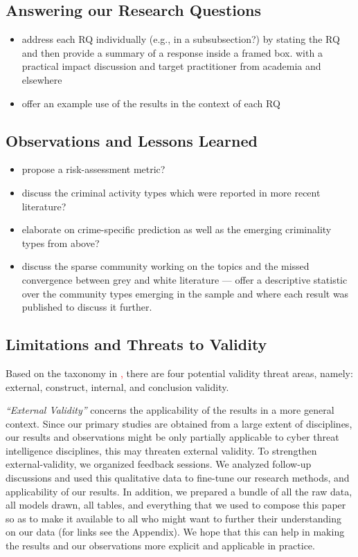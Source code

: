 \subsection{Answering our Research Questions}

\begin{itemize}
\item address each RQ individually (e.g., in a subsubsection?) by stating the RQ and then provide a summary of a response inside a framed box. with a practical impact discussion and target practitioner from academia and elsewhere
\item offer an example use of the results in the context of each RQ
\end{itemize}


\subsection{Observations and Lessons Learned}

\begin{itemize}
\item propose a risk-assessment metric?
\item discuss the criminal activity types which were reported in more recent literature?
\item elaborate on crime-specific prediction as well as the emerging criminality types from above?
\item discuss the sparse community working on the topics and the missed convergence between grey and white literature --- offer a descriptive statistic over the community types emerging in the sample and where each result was published to discuss it further.
\end{itemize}

\subsection{Limitations and Threats to Validity}

Based on the taxonomy in \textcolor{red}{\cite{wohlin}, }there are four potential validity threat areas, namely: external, construct, internal, and conclusion validity. 

\emph{ ``External Validity''} concerns the applicability of the results in a more general context. Since our primary studies are obtained from a large extent of disciplines, our results and observations might be only partially applicable to cyber threat intelligence disciplines, this may threaten external validity. To strengthen external-validity, we organized feedback sessions. We analyzed follow-up discussions and used this qualitative data to fine-tune our research methods, and applicability of our results. In addition, we prepared a bundle of all the raw data, all models drawn, all tables, and everything that we used to compose this paper so as to make it available to all who might want to further their understanding on our data (for links see the Appendix). We hope that this can help in making the results and our observations more explicit and applicable in practice.

